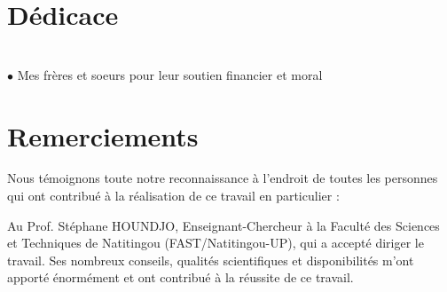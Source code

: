 \documentclass[a4paper,12pt]{report}
\theoremstyle{plain}
\theoremstyle{plain}
\begin{document}
\begin{titlepage}
% 
%  
\end{titlepage}
\onehalfspacing
\maketitle
\doparttoc
\dopartlof
\dopartlot
\dominitoc
\doparttoc
\dopartlof
\dopartlot
\dominilof
\dominilot
\dominitoc

\chapter*{D\'edicace}

\vspace*{5.cm}
\begin{center}
\begin{flushleft}
 \\
$\bullet$ Mes frères et soeurs pour leur soutien financier et moral


\end{flushleft}
\end{center}



\chapter*{Remerciements}
 
 
	Nous témoignons toute notre reconnaissance à l'endroit de toutes les personnes qui 
ont contribué à la réalisation de ce travail en particulier  :

Au Prof. Stéphane HOUNDJO, Enseignant-Chercheur à la Faculté des Sciences et Techniques de Natitingou (FAST/Natitingou-UP), qui a accepté diriger  le travail. Ses  nombreux conseils, qualités scientifiques et disponibilités m’ont apporté énormément et ont contribué à la réussite de ce travail.
\end{document}
